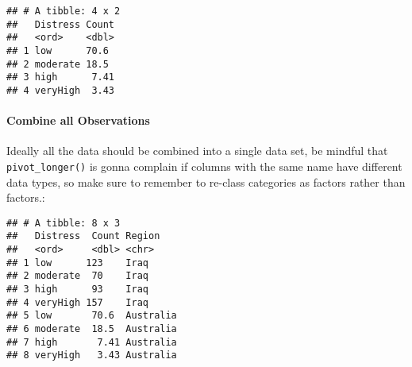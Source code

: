 \documentclass[
]{article}
\newenvironment{Shaded}{\begin{snugshade}}{\end{snugshade}}
\newcommand{\CommentTok}[1]{\textcolor[rgb]{0.56,0.35,0.01}{\textit{#1}}}
\newcommand{\DataTypeTok}[1]{\textcolor[rgb]{0.13,0.29,0.53}{#1}}
\newcommand{\KeywordTok}[1]{\textcolor[rgb]{0.13,0.29,0.53}{\textbf{#1}}}
\newcommand{\NormalTok}[1]{#1}
\newcommand{\OperatorTok}[1]{\textcolor[rgb]{0.81,0.36,0.00}{\textbf{#1}}}
\newcommand{\OtherTok}[1]{\textcolor[rgb]{0.56,0.35,0.01}{#1}}
\newcommand{\StringTok}[1]{\textcolor[rgb]{0.31,0.60,0.02}{#1}}
\begin{document}
\begin{verbatim}
## # A tibble: 4 x 2
##   Distress Count
##   <ord>    <dbl>
## 1 low      70.6 
## 2 moderate 18.5 
## 3 high      7.41
## 4 veryHigh  3.43
\end{verbatim}

\hypertarget{combine-all-observations}{%
\paragraph{Combine all Observations}\label{combine-all-observations}}

Ideally all the data should be combined into a single data set, be
mindful that \texttt{pivot\_longer()} is gonna complain if columns with
the same name have different data types, so make sure to remember to
re-class categories as factors rather than factors.:

\begin{Shaded}
\end{Shaded}

\begin{verbatim}
## # A tibble: 8 x 3
##   Distress  Count Region   
##   <ord>     <dbl> <chr>    
## 1 low      123    Iraq     
## 2 moderate  70    Iraq     
## 3 high      93    Iraq     
## 4 veryHigh 157    Iraq     
## 5 low       70.6  Australia
## 6 moderate  18.5  Australia
## 7 high       7.41 Australia
## 8 veryHigh   3.43 Australia
\end{verbatim}

\begin{Shaded}
\end{Shaded}
\end{document}
